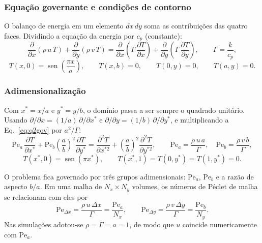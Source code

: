 \subsubsection*{Equação governante e condições de contorno}

O balanço de energia em um elemento $dx\,dy$ soma as contribuições das quatro
faces. Dividindo a equação da energia por $c_p$ (constante):
\begin{equation}
  \frac{\partial}{\partial x}\left(\rho\,u\,T\right)
  +\frac{\partial}{\partial y}\left(\rho\,v\,T\right)
  =\frac{\partial}{\partial x}\left(\Gamma\,\frac{\partial T}{\partial x}\right)
  +\frac{\partial}{\partial y}\left(\Gamma\,\frac{\partial T}{\partial y}\right),
  \qquad \Gamma=\frac{k}{c_p},
  \label{eq:q2gov}
\end{equation}
\[
  T(x,0)=\operatorname{sen}\left(\frac{\pi x}{a}\right),\qquad
  T(x,b)=0,\qquad T(0,y)=0,\qquad T(a,y)=0 .
\]

\subsubsection*{Adimensionalização}

Com $x^*=x/a$ e $y^*=y/b$, o domínio passa a ser sempre o quadrado unitário.
Usando $\partial/\partial x=(1/a)\,\partial/\partial x^*$ e
$\partial/\partial y=(1/b)\,\partial/\partial y^*$, e multiplicando a
Eq.~\eqref{eq:q2gov} por $a^2/\Gamma$:
\begin{equation}
  \mathrm{Pe}_a\,\frac{\partial T}{\partial x^*}
  +\mathrm{Pe}_b\left(\frac{a}{b}\right)^{2}\frac{\partial T}{\partial y^*}
  =\frac{\partial^2T}{\partial x^{*2}}
  +\left(\frac{a}{b}\right)^{2}\frac{\partial^2T}{\partial y^{*2}},
  \qquad
  \mathrm{Pe}_a=\frac{\rho\,u\,a}{\Gamma},\quad
  \mathrm{Pe}_b=\frac{\rho\,v\,b}{\Gamma},
  \label{eq:q2adim}
\end{equation}
\[
  T(x^*,0)=\operatorname{sen}(\pi x^*),\qquad
  T(x^*,1)=T(0,y^*)=T(1,y^*)=0 .
\]

O problema fica governado por três grupos adimensionais: $\mathrm{Pe}_a$,
$\mathrm{Pe}_b$ e a razão de aspecto $b/a$. Em uma malha de
$N_x\times N_y$ volumes, os números de Péclet de malha se relacionam com eles
por
\[
  \mathrm{Pe}_{\Delta x}=\frac{\rho\,u\,\Delta x}{\Gamma}=\frac{\mathrm{Pe}_a}{N_x},
  \qquad
  \mathrm{Pe}_{\Delta y}=\frac{\rho\,v\,\Delta y}{\Gamma}=\frac{\mathrm{Pe}_b}{N_y}.
\]
Nas simulações adotou-se $\rho=\Gamma=a=1$, de modo que $u$ coincide
numericamente com $\mathrm{Pe}_a$.

